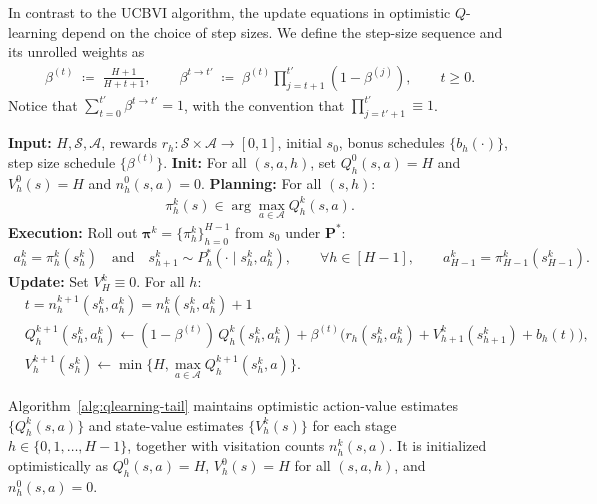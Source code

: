 \documentclass[11pt]{article}
\newcommand{\pii}{\boldsymbol{\pi}}
\newcommand{\pp}{\boldsymbol{P}}
\newcommand{\lr}{\beta}
\begin{document}
In contrast to the UCBVI algorithm, the update equations in optimistic $Q$-learning depend on the choice of step sizes.
We define the step-size sequence and its unrolled weights as
\begin{align}\label{eq:alpha-weights}
\lr^{(t)} \;\coloneqq\; \frac{H+1}{H+t+1},\qquad  \lr^{t\rightarrow t'} \;\coloneqq\; \lr^{(t)} \prod_{j=t+1}^{t'} (1-\lr^{(j)})
,\qquad t\ge 0.
\end{align}
Notice that $\sum_{t=0}^{t'} \lr^{t\to t'}=1$, with the convention that $\prod_{j=t'+1}^{t'} \equiv 1$.

\begin{algorithm}[t]
\caption{Optimistic Q-learning}
\label{alg:qlearning-tail}
\begin{algorithmic}[1]
\STATE \textbf{Input:} $H,\mathcal S,\mathcal A$, rewards $r_h:\mathcal{S}\times\mathcal{A}\to[0,1]$, initial $s_0$, bonus schedules $\{b_h(\cdot)\}$, step size schedule $\{\lr^{(t)}\}$.
\STATE \textbf{Init:} For all $(s,a,h)$, set $Q_h^0(s,a)= H$ and $V_h^0(s)= H$ and $n_h^0(s,a)= 0$. 
    \STATE \textbf{Planning:} For all $(s,h)$:
\begin{align*}
\pi_h^k(s)\in\arg\max_{a\in\mathcal{A}}Q_h^k(s,a).
\end{align*} \label{alg:planning_line}
    \STATE \textbf{Execution:} Roll out $\pii^k=\{\pi_h^k\}_{h=0}^{H-1}$ from $s_0$ under $\pp^*$:
    \begin{align*}
    a_h^k=\pi_h^k(s_h^k)\quad \text{and} \quad s_{h+1}^k\sim P_h^*(\cdot\mid s_h^k,a_h^k),\qquad \forall h\in[H-1] , \qquad a_{H-1}^k=\pi_{H-1}^k(s_{H-1}^k).
    \end{align*}
    \STATE \textbf{Update:}
    Set $V_{H}^k\equiv 0$.
    For all $h$:  
    \begin{align*}
    &t=n_h^{k+1}(s_h^k,a_h^k)= n_h^k(s_h^k,a_h^k)+1\\
    &Q_h^{k+1}(s_h^k,a_h^k) \leftarrow (1-\lr^{(t)})\,Q_h^k(s_h^k,a_h^k)
    +\lr^{(t)} \Big(r_h(s_h^k,a_h^k)+V_{h+1}^k(s_{h+1}^k)+ b_h(t)\Big),\\
    &V_h^{k+1}(s_h^k) \leftarrow \min\{H,\max_{a\in\mathcal{A}} Q_h^{k+1}(s_h^k,a)\}.
    \end{align*}
\ENDFOR
\end{algorithmic}
\end{algorithm}

Algorithm~\ref{alg:qlearning-tail} maintains optimistic action-value estimates
$\{Q_h^k(s,a)\}$ and state-value estimates $\{V_h^k(s)\}$ for each stage
$h\in\{0,1,\dots,H-1\}$, together with visitation counts $n_h^k(s,a)$.
It is initialized optimistically as
$Q_h^0(s,a)=H$, $V_h^0(s)=H$ for all $(s,a,h)$, and $n_h^0(s,a)=0$.
\end{document}
